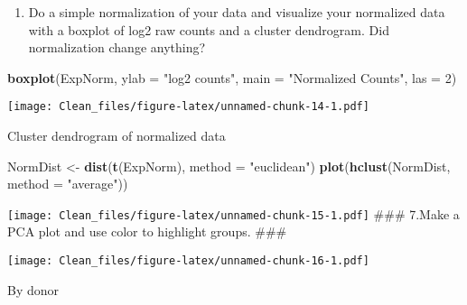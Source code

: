 \documentclass[
]{article}
\newenvironment{Shaded}{\begin{snugshade}}{\end{snugshade}}
\newcommand{\AttributeTok}[1]{\textcolor[rgb]{0.13,0.29,0.53}{#1}}
\newcommand{\DecValTok}[1]{\textcolor[rgb]{0.00,0.00,0.81}{#1}}
\newcommand{\FunctionTok}[1]{\textcolor[rgb]{0.13,0.29,0.53}{\textbf{#1}}}
\newcommand{\NormalTok}[1]{#1}
\newcommand{\OtherTok}[1]{\textcolor[rgb]{0.56,0.35,0.01}{#1}}
\newcommand{\SpecialCharTok}[1]{\textcolor[rgb]{0.81,0.36,0.00}{\textbf{#1}}}
\newcommand{\StringTok}[1]{\textcolor[rgb]{0.31,0.60,0.02}{#1}}
\providecommand{\tightlist}{%
  \setlength{\itemsep}{0pt}\setlength{\parskip}{0pt}}
\begin{document}
\begin{enumerate}
\def\labelenumi{\arabic{enumi}.}
\setcounter{enumi}{5}
\tightlist
\item
  Do a simple normalization of your data and visualize your normalized
  data with a boxplot of log2 raw counts and a cluster dendrogram. Did
  normalization change anything?
\end{enumerate}

\begin{Shaded}
\begin{Highlighting}[]
\FunctionTok{boxplot}\NormalTok{(ExpNorm, }\AttributeTok{ylab =} \StringTok{"log2 counts"}\NormalTok{, }\AttributeTok{main =} \StringTok{"Normalized Counts"}\NormalTok{, }\AttributeTok{las =} \DecValTok{2}\NormalTok{)}
\end{Highlighting}
\end{Shaded}

\texttt{[image: Clean\_files/figure-latex/unnamed-chunk-14-1.pdf]}

Cluster dendrogram of normalized data

\begin{Shaded}
\begin{Highlighting}[]
\NormalTok{NormDist }\OtherTok{\textless{}{-}} \FunctionTok{dist}\NormalTok{(}\FunctionTok{t}\NormalTok{(ExpNorm), }\AttributeTok{method =} \StringTok{"euclidean"}\NormalTok{)}
\FunctionTok{plot}\NormalTok{(}\FunctionTok{hclust}\NormalTok{(NormDist, }\AttributeTok{method =} \StringTok{"average"}\NormalTok{))}
\end{Highlighting}
\end{Shaded}

\texttt{[image: Clean\_files/figure-latex/unnamed-chunk-15-1.pdf]} \#\#\#
7.Make a PCA plot and use color to highlight groups. \#\#\#

\begin{Shaded}
\end{Shaded}

\texttt{[image: Clean\_files/figure-latex/unnamed-chunk-16-1.pdf]}

By donor
\end{document}
